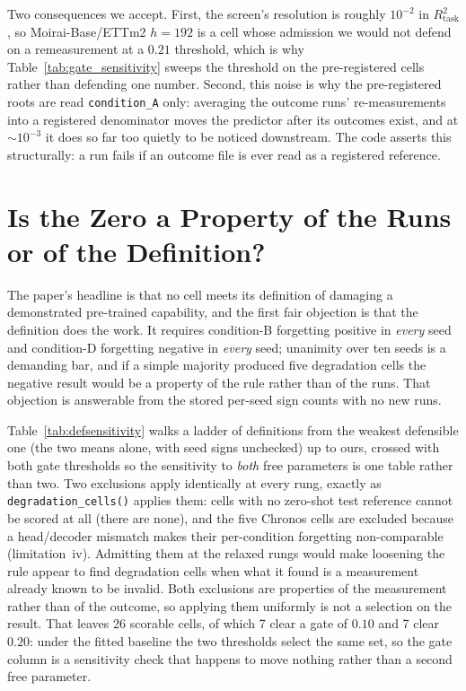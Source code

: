 Two consequences we accept.  First, the screen's resolution is roughly $10^{-2}$ in
$R^2_\text{task}$, so Moirai-Base/ETTm2 $h{=}192$ is a cell whose admission we would
not defend on a remeasurement at a $0.21$ threshold, which is why
Table~\ref{tab:gate_sensitivity} sweeps the threshold on the pre-registered cells
rather than defending one number.  Second, this noise is why the pre-registered
roots are read \texttt{condition\_A} only: averaging the outcome runs'
re-measurements into a registered denominator moves the predictor after its
outcomes exist, and at ${\sim}10^{-3}$ it does so far too quietly to be noticed
downstream.  The code asserts this structurally: a run fails if an outcome file
is ever read as a registered reference.

\section{Is the Zero a Property of the Runs or of the Definition?}
\label{app:defsensitivity}

The paper's headline is that no cell meets its definition of damaging a
demonstrated pre-trained capability, and the first fair objection is that the
definition does the work. It requires condition-B forgetting positive in
\emph{every} seed and condition-D forgetting negative in \emph{every} seed;
unanimity over ten seeds is a demanding bar, and if a simple majority produced
five degradation cells the negative result would be a property of the rule rather
than of the runs. That objection is answerable from the stored per-seed sign
counts with no new runs.

Table~\ref{tab:defsensitivity} walks a ladder of definitions from the weakest
defensible one (the two means alone, with seed signs unchecked) up to ours,
crossed with both gate thresholds so the sensitivity to \emph{both} free
parameters is one table rather than two. Two exclusions apply identically at every
rung, exactly as \texttt{degradation\_cells()} applies them: cells with no
zero-shot test reference cannot be scored at all (there are none), and the five
Chronos cells are excluded because a head/decoder mismatch makes their
per-condition forgetting non-comparable (limitation~iv). Admitting them at the
relaxed rungs would make loosening the rule appear to find degradation cells when
what it found is a measurement already known to be invalid. Both exclusions are
properties of the measurement rather than of the outcome, so applying them
uniformly is not a selection on the result. That leaves 26 scorable cells, of
which 7 clear a gate of $0.10$ and 7 clear $0.20$: under the fitted baseline the
two thresholds select the same set, so the gate column is a sensitivity check that
happens to move nothing rather than a second free parameter.

